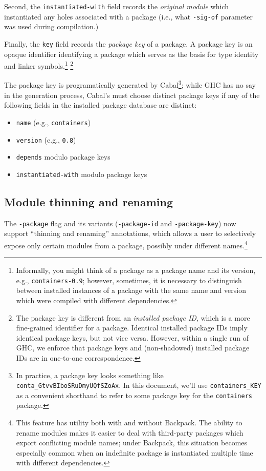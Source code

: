 \documentclass{article}
\begin{document}
Second, the \texttt{instantiated-with} field records the \emph{original
module} which instantiated any holes associated with a package (i.e.,
what \texttt{-sig-of} parameter was used during compilation.)

Finally, the \texttt{key} field records the \emph{package key} of a
package.  A package key is an opaque identifier identifying a package
which serves as the basis for type identity and linker
symbols.\footnote{Informally, you might think of a package as a package
name and its version, e.g., \texttt{containers-0.9}; however, sometimes,
it is necessary to distinguish between installed instances of a package
with the same name and version which were compiled with different
dependencies.} \footnote{The package key is different from an
\emph{installed package ID}, which is a more fine-grained identifier for
a package.  Identical installed package IDs imply identical package
keys, but not vice versa.  However, within a single run of GHC, we
enforce that package keys and (non-shadowed) installed package IDs are
in one-to-one correspondence.}

The package key is programatically generated by Cabal\footnote{In
practice, a package key looks something like
\texttt{conta\_GtvvBIboSRuDmyUQfSZoAx}.  In this document, we'll use
\texttt{containers\_KEY} as a convenient shorthand to refer to some
package key for the \texttt{containers} package.}; while GHC has no say
in the generation process,  Cabal's must choose distinct package keys if
any of the following fields in the installed package database are
distinct:

\begin{itemize}
\item \texttt{name} (e.g., \texttt{containers})
\item \texttt{version} (e.g., \texttt{0.8})
\item \texttt{depends} modulo package keys
\item \texttt{instantiated-with} modulo package keys
\end{itemize}

\subsection{Module thinning and renaming}

The \texttt{-package} flag and its variants (\texttt{-package-id} and
\texttt{-package-key}) now support ``thinning and renaming''
annotations, which allows a user to selectively expose only certain
modules from a package, possibly under different names.\footnote{This
feature has utility both with and without Backpack.  The ability to
rename modules makes it easier to deal with third-party packages which
export conflicting module names; under Backpack, this situation becomes
especially common when an indefinite package is instantiated multiple
time with different dependencies.}
\end{document}
